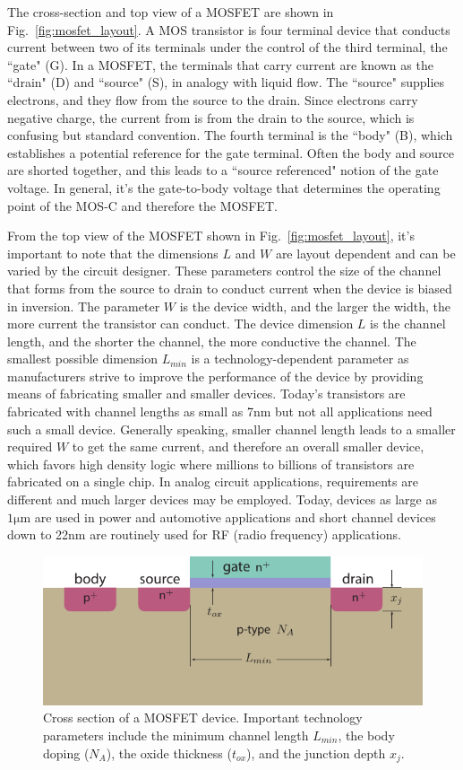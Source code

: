 The cross-section and top view of a MOSFET are shown in Fig.~\ref{fig:mosfet_layout}.  A MOS transistor is four terminal device that conducts current between two of its terminals under the control of the third terminal, the ``gate" (G).  In a MOSFET, the terminals that carry current are known as the ``drain" (D) and ``source" (S), in analogy with liquid flow.  The ``source" supplies electrons, and they flow from the source to the drain.  Since electrons carry negative charge, the current from is from the drain to the source, which is confusing but standard convention.  The fourth terminal is the ``body" (B), which establishes a potential reference for the gate terminal.  Often the body and source are shorted together, and this leads to a ``source referenced" notion of the gate voltage.  In general, it's the gate-to-body voltage that determines the operating point of the MOS-C and therefore the MOSFET.

From the top view of the MOSFET shown in Fig.~\ref{fig:mosfet_layout}, it's important to note that the dimensions $L$ and $W$ are layout dependent and can be varied by the circuit designer.  These parameters control the size of the channel that forms from the source to drain to conduct current when the device is biased in inversion.  The parameter $W$ is the device width, and the larger the width, the more current the transistor can conduct.  The device dimension $L$ is the channel length, and  the shorter the channel, the more conductive the channel.  The smallest possible dimension $L_{min}$ is a technology-dependent parameter as manufacturers strive to improve the performance of the device by providing means of fabricating smaller and smaller devices.  Today's transistors are fabricated with channel lengths as small as 7nm but not all applications need such a small device.  Generally speaking, smaller channel length leads to a smaller required $W$ to get the same current, and therefore an overall smaller device, which favors high density logic where millions to billions of transistors are fabricated on a single chip.  In analog circuit applications, requirements are different and much larger devices may be employed.  Today, devices as large as $1\mathrm{\mu m}$ are used in power and automotive applications and short channel devices down to 22nm are routinely used for RF (radio frequency) applications.  


\begin{figure}[tb]
\begin{center}
\includegraphics[width=.75\columnwidth]{mos_tech}
\end{center}
\caption{Cross section of a MOSFET device. Important technology parameters include the minimum channel length $L_{min}$, the body doping ($N_A$), the oxide thickness ($t_{ox}$), and the junction depth $x_j$.} \label{fig:mos_tech}
\end{figure}


